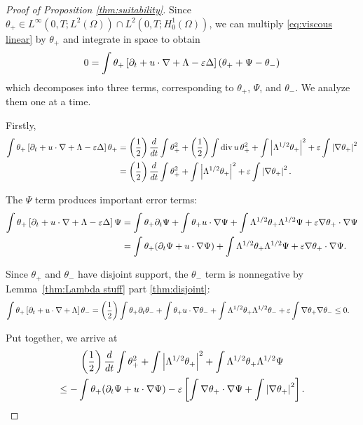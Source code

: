 \begin{proof}[Proof of Proposition \ref{thm:suitability}]
Since $\theta_+ \in L^\infty(0,T; L^2(\Omega)) \cap L^2(0,T; H_0^1(\Omega))$, we can multiply \eqref{eq:viscous linear} by $\theta_+$ and integrate in space to obtain
\[ 0 = \int \theta_+ \left[  \partial_t + u \cdot \nabla + \Lambda - \varepsilon \Delta \right] \left( \theta_+ + \Psi - \theta_- \right) \]
which decomposes into three terms, corresponding to $\theta_+$, $\Psi$, and $\theta_-$.  We analyze them one at a time.  

Firstly,
\begin{align*} 
\int \theta_+ \left[  \partial_t + u \cdot \nabla + \Lambda -\varepsilon\Delta \right] \theta_+ &= \left( \frac{1}{2} \right) \frac{d}{dt} \int \theta_+^2 + \left( \frac{1}{2} \right) \int \operatorname{div} u \, \theta_+^2 + \int \left\lvert \Lambda^{1/2} \theta_+ \right\rvert^2 + \varepsilon \int \left\lvert \nabla\theta_+ \right\rvert^2
\\ &= \left( \frac{1}{2} \right) \frac{d}{dt} \int \theta_+^2 + \int \left\lvert \Lambda^{1/2} \theta_+ \right\rvert^2 + \varepsilon \int \left\lvert \nabla\theta_+ \right\rvert^2.
\end{align*}

The $\Psi$ term produces important error terms:
\begin{align*} 
\int \theta_+ \left[  \partial_t + u \cdot \nabla + \Lambda -\varepsilon\Delta \right] \Psi &= \int \theta_+ \partial_t \Psi + \int \theta_+ u \cdot \nabla \Psi + \int \Lambda^{1/2} \theta_+ \Lambda^{1/2} \Psi + \varepsilon \nabla\theta_+ \cdot \nabla\Psi
\\ &= \int \theta_+ (\partial_t \Psi + u \cdot \nabla \Psi) + \int \Lambda^{1/2} \theta_+ \Lambda^{1/2} \Psi + \varepsilon \nabla\theta_+ \cdot \nabla\Psi.
\end{align*}

Since $\theta_+$ and $\theta_-$ have disjoint support, the $\theta_-$ term is nonnegative by Lemma~\ref{thm:Lambda stuff} part \eqref{thm:disjoint}:
\begin{align*} 
\int \theta_+ \left[  \partial_t + u \cdot \nabla + \Lambda  \right] \theta_- &= \left( \frac{1}{2} \right) \int \theta_+ \partial_t \theta_- + \int \theta_+ u \cdot \nabla \theta_- + \int \Lambda^{1/2} \theta_+ \Lambda^{1/2} \theta_- + \varepsilon\int \nabla\theta_+ \nabla\theta_-
\leq 0.
\end{align*}

Put together, we arrive at 
\begin{multline} \label{first form of cacciopolli} \left( \frac{1}{2} \right) \frac{d}{dt} \int \theta_+^2 + \int \left\lvert \Lambda^{1/2} \theta_+ \right\rvert^2 + \int \Lambda^{1/2} \theta_+ \Lambda^{1/2} \Psi 
\\* \leq -\int \theta_+ (\partial_t \Psi + u \cdot \nabla \Psi) - \varepsilon \left[ \int \nabla\theta_+ \cdot \nabla\Psi + \int \left\lvert \nabla\theta_+ \right\rvert^2 \right]. \end{multline}


\end{proof}
